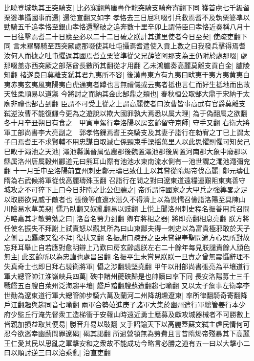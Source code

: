 比曉登城執其王突騎支|{
	比必寐翻舊唐書作龍突騎支騎奇寄翻下同}
獲首虜七千級留栗婆凖攝國事而還|{
	還從宣翻又如字}
孝恪去三日屈利啜引兵救焉耆不及執栗婆凖以勁騎五千追孝恪至銀山孝恪還擊破之追奔數十里辛卯上謂侍臣曰孝恪近奏稱八月十一日往擊焉耆二十日應至必以二十二日破之朕計其道里使者今日至矣|{
	使疏吏翻下同}
言未畢驛騎至西突厥處那啜使其吐屯攝焉耆遣使入貢上數之曰我發兵擊得焉耆汝何人而據之吐屯懼返其國焉耆立栗婆準從父兄薛婆阿那支為王仍附於處那啜|{
	處那啜盖亦西突厥之部落酋長數所其翻從才用翻}
乙未鴻臚奏高麗莫離支貢白金|{
	臚陵知翻}
禇遂良曰莫離支弑其君九夷所不容|{
	後漢書東方有九夷曰畎夷干夷方夷黄夷白夷赤夷玄夷風夷陽夷白虎通夷者蹲也言無禮儀或云夷者抵也言仁而好生抵地而出故天性柔順易以道禦}
今將討之而納其金此郜鼎之類也|{
	春秋桓公取郜大鼎于宋納于太廟非禮也郜古到翻}
臣謂不可受上從之上謂高麗使者曰汝曹皆事高武有官爵莫離支弑逆汝曹不能復讎今更為之遊說以欺大國罪孰大焉悉以属大理|{
	為于偽翻属之欲翻}
冬十月辛丑朔日有食之　甲寅車駕行幸洛陽以房玄齡留守京師|{
	守手又翻}
右衛大將軍工部尚書李大亮副之　郭孝恪鏁焉耆王突騎支及其妻子詣行在勑宥之丁巳上謂太子曰焉耆王不求賢輔不用忠謀自取滅亡係頸束手溧揺萬里人以此思懼則懼可知矣己巳畋于澠池之天池|{
	澠池縣漢晉属弘農郡後魏置澠池郡後周置河南郡大象中廢郡以縣属洛州唐属穀州酈道元曰熊耳山際有池池水東南流水側有一池世謂之澠池澠彌兖翻}
十一月壬申至洛陽前宜州刺史鄭元璹已致仕上以其嘗從隋焬帝伐高麗|{
	鄭元璹仕隋為右武候將軍從伐高麗璹殊玉翻}
召詣行在問之對曰遼東道遠糧運艱阻東夷善守城攻之不可猝下上曰今日非隋之比公但聼之|{
	帝所謂恃國家之大甲兵之強筭畧之足以取勝欲見威于敵者也}
張儉等值遼水漲久不得濟上以為畏懦召儉詣洛陽至具陳山川險易水草美惡|{
	懦乃臥翻又奴亂翻易以豉翻}
上悦上聞洛州刺史程名振善用兵召問方略嘉其才敏勞勉之曰|{
	洛音名勞力到翻}
卿有將相之器|{
	將即亮翻相息亮翻}
朕方將任使名振失不拜謝上試責怒以觀其所為曰山東鄙夫得一刺史以為富貴極邪敢於天子之側言語麤疎又復不拜|{
	復扶又翻}
名振謝曰疎野之臣未嘗親奉聖問適方心思所對故忘拜耳舉止自若應對愈明辯上乃歎曰房玄齡處朕左右二十餘年每見朕譴責餘人顔色無主|{
	此玄齡所以為忠謹也處昌呂翻}
名振平生未嘗見朕朕一旦責之曾無震懾辭理不失真奇士也即日拜右驍衛將軍|{
	懾之涉翻驍堅堯翻}
甲午以刑部尚書張亮為平壤道行軍大總管帥江淮嶺峽兵四萬|{
	硤中諸州夔硤歸是也帥讀曰率下同}
長安洛陽募士三千戰艦五百艘自萊州泛海趨平壤|{
	艦戶黯翻艘蘇遭翻趨七喻翻}
又以太子詹事左衛率李世勣為遼東道行軍大總管帥步騎六萬及蘭河二州降胡趣遼東|{
	率所律翻騎奇寄翻降戶江翻趣與趨同音七喻翻}
兩軍合勢竝進庚子諸軍大集於幽州遣行軍總管姜行本少府少監丘行淹先督衆工造梯衝于安蘿山時遠近勇士應募及獻攻城器械者不可勝數上皆親加損益取其便易|{
	勝音升易以豉翻}
又手詔諭天下以高麗蓋蘇文弑主虐民情何可忍今欲廵幸幽薊問罪遼碣|{
	碣其謁翻}
所過營頓無為勞費且言昔隋焬帝殘暴其下高麗王仁愛其民以思亂之軍擊安和之衆故不能成功今略言必勝之道有五一曰以大擊小二曰以順討逆三曰以治乘亂|{
	治直吏翻}

